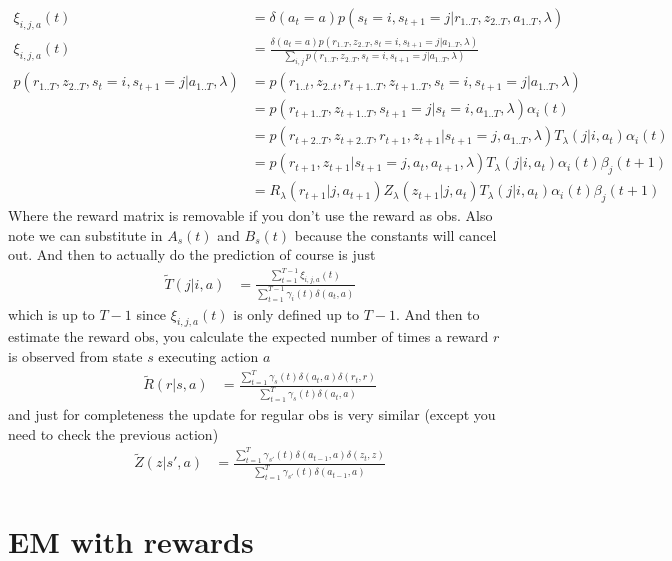 \documentclass[10pt,english]{article}
\begin{document}
\begin{align}
\xi_{i,j,a}(t) &= \delta(a_t=a)p(s_t=i,s_{t+1}=j|r_{1..T},z_{2..T},a_{1..T},\lambda) \\
\xi_{i,j,a}(t) &= \frac{\delta(a_t=a)p(r_{1..T},z_{2..T},s_t=i,s_{t+1}=j|a_{1..T},\lambda)}{\sum_{i,j} p(r_{1..T},z_{2..T},s_t=i,s_{t+1}=j|a_{1..T},\lambda)}\\
p(r_{1..T},z_{2..T},s_t=i,s_{t+1}=j|a_{1..T},\lambda) &= p(r_{1..t},z_{2..t},r_{t+1..T},z_{t+1..T},s_t=i,s_{t+1}=j|a_{1..T},\lambda) \\
&= p(r_{t+1..T},z_{t+1..T},s_{t+1}=j|s_t=i,a_{1..T},\lambda) \alpha_i(t) \\
&= p(r_{t+2..T},z_{t+2..T},r_{t+1},z_{t+1}|s_{t+1}=j,a_{1..T},\lambda) T_\lambda(j|i,a_t) \alpha_i(t) \\
&= p(r_{t+1},z_{t+1}|s_{t+1}=j,a_{t},a_{t+1},\lambda) T_\lambda(j|i,a_t) \alpha_i(t) \beta_j(t+1) \\
&= R_\lambda(r_{t+1}|j,a_{t+1}) Z_\lambda(z_{t+1}|j,a_t) T_\lambda(j|i,a_t) \alpha_i(t) \beta_j(t+1)
\end{align}
Where the reward matrix is removable if you don't use the reward as obs. Also note we can substitute in $A_s(t)$ and $B_s(t)$ because the constants will cancel out. And then to actually do the prediction of course is just
\begin{align}
\tilde{T}(j|i,a) &= \frac{\sum_{t=1}^{T-1} \xi_{i,j,a}(t)}{\sum_{t=1}^{T-1} \gamma_i(t)\delta(a_t,a)}
\end{align}
which is up to $T-1$ since $\xi_{i,j,a}(t)$ is only defined up to $T-1$. And then to estimate the reward obs, you calculate the expected number of times a reward $r$ is observed from state $s$ executing action $a$
\begin{align}
\tilde{R}(r|s,a) &= \frac{\sum_{t=1}^T \gamma_s(t)\delta(a_t,a)\delta(r_t,r)}{\sum_{t=1}^T \gamma_s(t)\delta(a_t,a)}
\end{align}
and just for completeness the update for regular obs is very similar (except you need to check the previous action)
\begin{align}
\tilde{Z}(z|s',a) &= \frac{\sum_{t=1}^T \gamma_{s'}(t)\delta(a_{t-1},a)\delta(z_t,z)}{\sum_{t=1}^T \gamma_{s'}(t)\delta(a_{t-1},a)}
\end{align}

\section{EM with rewards}
\end{document}
